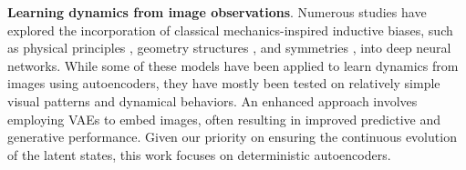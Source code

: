 \textbf{Learning dynamics from image observations}.
Numerous studies have explored the incorporation of classical mechanics-inspired inductive biases, such as physical principles \citep{cranmer2020lagrangian, greydanus2019hamiltonian, michael2019deep, yu2021onsagernet, zhang2022gfinns}, geometry structures \citep{eldred2024lie, jin2020sympnets, zhu2022vpnets}, and symmetries \citep{huh2020time, yang2024symmetry}, into deep neural networks. While some of these models have been applied to learn dynamics from images using autoencoders, they have mostly been tested on relatively simple visual patterns and dynamical behaviors.
An enhanced approach \citep{botev2021priors, toth2020hamintonian} involves employing VAEs to embed images, often resulting in improved predictive and generative performance. Given our priority on ensuring the continuous evolution of the latent states, this work focuses on deterministic autoencoders.

